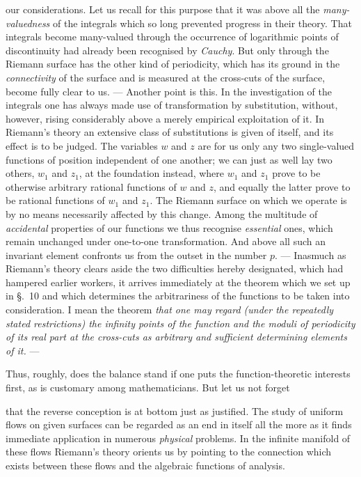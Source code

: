 \documentclass{article}
\begin{document}
our considerations. Let us recall for this purpose that it was above all the \emph{many-valuedness} of the integrals which so long prevented progress in their theory. That integrals become many-valued through the occurrence of logarithmic points of discontinuity had already been recognised by \emph{Cauchy}. But only through the Riemann surface has the other kind of periodicity, which has its ground in the \emph{connectivity} of the surface and is measured at the cross-cuts of the surface, become fully clear to us. --- Another point is this. In the investigation of the integrals one has always made use of transformation by substitution, without, however, rising considerably above a merely empirical exploitation of it. In Riemann's theory an extensive class of substitutions is given of itself, and its effect is to be judged. The variables $w$ and $z$ are for us only any two single-valued functions of position independent of one another; we can just as well lay two others, $w_{1}$ and $z_{1}$, at the foundation instead, where $w_{1}$ and $z_{1}$ prove to be otherwise arbitrary rational functions of $w$ and $z$, and equally the latter prove to be rational functions of $w_{1}$ and $z_{1}$. The Riemann surface on which we operate is by no means necessarily affected by this change. Among the multitude of \emph{accidental} properties of our functions we thus recognise \emph{essential} ones, which remain unchanged under one-to-one transformation. And above all such an invariant element confronts us from the outset in the number $p$. --- Inasmuch as Riemann's theory clears aside the two difficulties hereby designated, which had hampered earlier workers, it arrives immediately at the theorem which we set up in §.~10 and which determines the arbitrariness of the functions to be taken into consideration. I mean the theorem \emph{that one may regard (under the repeatedly stated restrictions) the infinity points of the function and the moduli of periodicity of its real part at the cross-cuts as arbitrary and sufficient determining elements of it.} ---

Thus, roughly, does the balance stand if one puts the function-theoretic interests first, as is customary among mathematicians. But let us not forget

that the reverse conception is at bottom just as justified. The study of uniform flows on given surfaces can be regarded as an end in itself all the more as it finds immediate application in numerous \emph{physical} problems. In the infinite manifold of these flows Riemann's theory orients us by pointing to the connection which exists between these flows and the algebraic functions of analysis.
\end{document}
